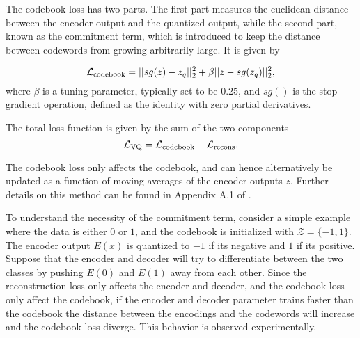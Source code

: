 \documentclass[../../thesis.tex]{subfiles}
\begin{document}
The codebook loss has two parts. The first part measures the euclidean distance between the encoder output and the quantized output, while the second part, known as the commitment term, which is introduced to keep the distance between codewords from growing arbitrarily large. It is given by 

\begin{equation}
    \mathcal{L}_{\text{codebook}} = ||sg(z) - z_q||_2^2 +\beta||z - sg(z_q)||_2^2,
\end{equation}
where $\beta$ is a tuning parameter, typically set to be $0.25$, and $sg()$ is the stop-gradient operation, defined as the identity with zero partial derivatives. \newline

The total loss function is given by the sum of the two components
    \begin{equation}     
        \label{eq:VQVAELoss}
            \mathcal{L}_{\text{VQ}} = \mathcal{L}_{\text{codebook}} + \mathcal{L}_{\text{recons}}.
    \end{equation}

The codebook loss only affects the codebook, and can hence alternatively be updated as a function of moving averages of the encoder outputs $z$. Further details on this method can be found in Appendix A.1 of \cite{VQVAE}.\newline 

To understand the necessity of the commitment term, consider a simple example where the data is either $0$ or $1$, and the codebook is initialized with $\mathcal{Z} = \{-1,1\}$. The encoder output $E(x)$ is quantized to $-1$ if its negative and $1$ if its positive. Suppose that the encoder and decoder will try to differentiate between the two classes by pushing $E(0)$ and $E(1)$ away from each other. Since the reconstruction loss only affects the encoder and decoder, and the codebook loss only affect the codebook, if the encoder and decoder parameter trains faster than the codebook the distance between the encodings and the codewords will increase and the codebook loss diverge. This behavior is observed experimentally.
\end{document}
